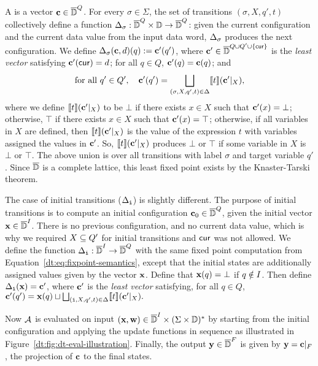 A  is a vector $\textbf{c} \in \overline{\mathbb{D}{}}^Q$.
For every $\sigma \in \Sigma$, the set of transitions $(\sigma, X, q', t)$
collectively define a function $\Delta_\sigma : \overline{\mathbb{D}{}}^Q \times \mathbb{D} \to \overline{\mathbb{D}{}}^Q$:
given the current configuration and the current data value from the input data word,
$\Delta_\sigma$ produces the next configuration.
We define $\Delta_\sigma(\textbf{c},d)(q) := \textbf{c}'(q')$,
where $\textbf{c}' \in \overline{\mathbb{D}{}}^{Q \cup Q' \cup \{\mathsf{cur}\}}$ is the \emph{least vector} satisfying
$\textbf{c}'(\mathsf{cur}) = d$; for all $q \in Q$, $\textbf{c}'(q) = \textbf{c}(q)$;
and
\begin{equation}
\text{for all }q' \in Q',\quad
\textbf{c}'(q') = \bigsqcup_{(\sigma, X, q', t) \in \Delta} \llbracket t \rrbracket(\textbf{c}'|_X),
\label{dt:eq:fixpoint-semantics}
\end{equation}
where we define $\llbracket t \rrbracket(\textbf{c}'|_X)$ to be $\bot$ if there exists $x \in X$ such that $\textbf{c}'(x) = \bot$; otherwise, $\top$ if there exists $x \in X$ such that $\textbf{c}'(x) = \top$; otherwise, if all variables in $X$ are defined, then $\llbracket t \rrbracket(\textbf{c}'|_X)$ is the value of the expression $t$ with variables assigned the values in $\textbf{c}'$.
So, $\llbracket t \rrbracket(\textbf{c}'|_X)$ produces $\bot$ or $\top$ if some variable in $X$ is $\bot$ or $\top$.
The above union is over all transitions with label $\sigma$ and target variable $q'$.
Since $\overline{\mathbb{D}{}}$ is a complete lattice, this least fixed point exists by the Knaster-Tarski theorem.

The case of initial transitions ($\Delta_{\texttt{i}}$) is slightly different. The purpose of initial transitions is to compute an initial configuration $\textbf{c}_0 \in \overline{\mathbb{D}{}}^{Q}$, given the initial vector $\textbf{x} \in \overline{\mathbb{D}{}}^I$. There is no previous configuration, and no current data value, which is why we required $X \subseteq Q'$ for initial transitions and $\mathsf{cur}$ was not allowed.
We define the function $\Delta_{\texttt{i}}: \overline{\mathbb{D}{}}^I \to \overline{\mathbb{D}{}}^Q$ with the same fixed point computation from Equation~\eqref{dt:eq:fixpoint-semantics}, except that the initial states are additionally assigned values given by the vector $\textbf{x}$. Define that $\textbf{x}(q) = \bot$ if $q \notin I$. Then define $\Delta_{\texttt{i}}(\textbf{x}) = \textbf{c}'$, where $\textbf{c}'$ is the \emph{least vector} satisfying, for all $q \in Q$,
$\textbf{c}'(q') = \textbf{x}(q) \sqcup \bigsqcup_{(\texttt{i}, X, q', t) \in \Delta} \llbracket t \rrbracket(\textbf{c}'|_X).$

Now $\mathcal{A}$ is evaluated on input
$(\textbf{x}, \textbf{w}) \in \overline{\mathbb{D}{}}^I \times (\Sigma \times \mathbb{D})^*$
by starting from the initial configuration and applying the update functions in sequence as illustrated in
Figure~\ref{dt:fig:dt-eval-illustration}.
Finally, the output $\textbf{y} \in \overline{\mathbb{D}{}}^F$ is given by $\textbf{y} = \textbf{c}|_{F}$, the projection of $\textbf{c}$ to the final states.

